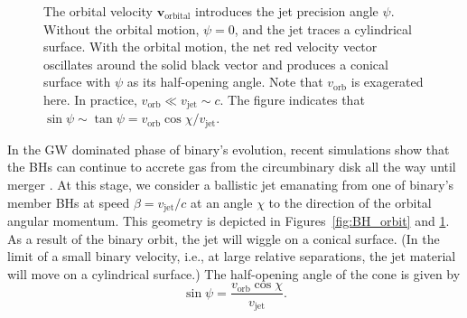 \documentclass[a4paper,fleqn,usenatbib]{mnras}
\begin{document}
\begin{figure}
  \begin{center}
  \end{center}
  \caption{The orbital velocity $\mathbf{v}_\mathrm{orbital}$
    introduces the jet precision angle $\psi$.  Without the orbital
    motion, $\psi=0$, and the jet traces a cylindrical surface.  With
    the orbital motion, the net red velocity vector oscillates around
    the solid black vector and produces a conical surface with $\psi$
    as its half-opening angle.  Note that $v_\mathrm{orb}$ is
    exagerated here.  In practice, $v_\mathrm{orb}\ll
    v_\mathrm{jet}\sim c$.  The figure indicates that
    $\sin{\psi}\sim\tan{\psi}=v_\mathrm{orb}\cos{\chi}/v_\mathrm{jet}$.}
  \label{fig:jet}
\end{figure}

In the GW dominated phase of binary's evolution, recent simulations
show that the BHs can continue to accrete gas from the circumbinary
disk all the way until merger \citep{2015MNRAS.446L..36F}.  At this
stage, we consider a ballistic jet emanating from one of binary's
member BHs at speed $\beta=v_\mathrm{jet}/c$ at an angle $\chi$ to the
direction of the orbital angular momentum.  This geometry is depicted
in Figures~\ref{fig:BH_orbit} and \ref{fig:jet}.  As a result of the
binary orbit, the jet will wiggle on a conical surface.  (In the limit
of a small binary velocity, i.e., at large relative separations, the
jet material will move on a cylindrical surface.)  The half-opening
angle of the cone is given by \citep{1993ApJ...409..130R}
\begin{equation}
  \sin\psi = \frac{v_\mathrm{orb}\cos\chi}{v_\mathrm{jet}}.
\end{equation}
\end{document}
